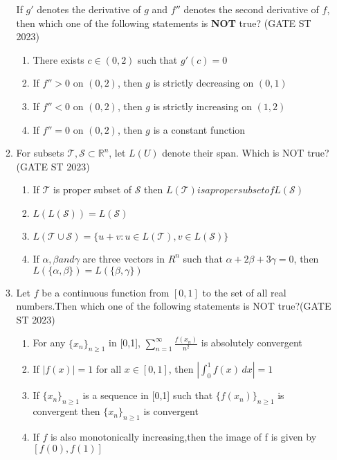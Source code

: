 \documentclass[journal]{IEEEtran}
\begin{document}
\begin{enumerate}[label=\textbf{Q.\arabic*.}, start=1, align=left, itemsep=2em]
\begin{enumerate}[label=\textbf{Q.\arabic*.}, start=11, align=left, itemsep=2em]
If $g'$ denotes the derivative of $g$ and $f''$ denotes the second derivative of $f$, then which one of the following statements is \textbf{NOT} true?  \hfill(GATE ST 2023)

\begin{enumerate}[label=(\Alph*)]
    \item There exists $c \in (0, 2)$ such that $g'(c) = 0$
    \item If $f'' > 0$ on $(0, 2)$, then $g$ is strictly decreasing on $(0, 1)$
    \item If $f'' < 0$ on $(0, 2)$, then $g$ is strictly increasing on $(1, 2)$
    \item If $f'' = 0$ on $(0, 2)$, then $g$ is a constant function
\end{enumerate}


\item For subsets $\mathcal{T}, \mathcal{S} \subset \mathbb{R}^n$, let $L(U)$ denote their span. Which is NOT true?\hfill(GATE ST 2023)
\begin{enumerate}[label=(\Alph*)]
\item If $\mathcal{T}$ is proper subset of $\mathcal{S}$ then $L(\mathcal{T}) is a proper subset of L(\mathcal{S})$
\item $L(L(\mathcal{S})) = L(\mathcal{S})$
\item $L(\mathcal{T} \cup \mathcal{S}) = \{u+v : u \in L(\mathcal{T}), v \in L(\mathcal{S})\}$
\item If $\alpha,\beta and \gamma$ are three vectors in $R^n$ such that $\alpha+2\beta+3\gamma=0$, then $L(\{\alpha,\beta\}) = L(\{\beta,\gamma\})$
\end{enumerate}

\item Let $f$ be a continuous function from $[0,1]$ to the set of all real numbers.Then which one of the following statements is NOT true?\hfill(GATE ST 2023)
\begin{enumerate}[label=(\Alph*)]
\item For any $\{x_n\}_{n \ge 1}$ in [0,1], $\sum_{n=1}^\infty \frac{f(x_n)}{n^2}$ is absolutely convergent
\item If $|f(x)|=1$ for all $x\in [0,1]$, then $|\int_0^1 f(x)\,dx| = 1$
\item If $\{x_n\}_{n \ge 1}$ is a sequence in [0,1] such that $\{f(x_n)\}_{n \ge 1}$ is convergent then $\{x_n\}_{n \ge 1}$ is convergent
\item If $f$ is also monotonically increasing,then the image of f is given by $[f(0), f(1)]$
\end{enumerate}


\end{enumerate}
\end{enumerate}
\end{document}
